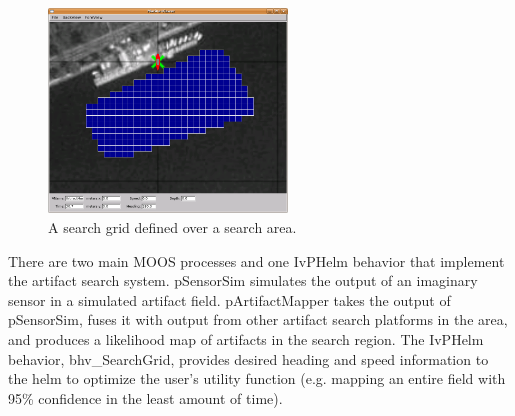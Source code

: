 \begin{figure}[ht]
\label{searchgrid}
\begin{minipage}[c]{0.5\textwidth}
  \centering \includegraphics[width=2.5in]{figures/searchgrid}
\end{minipage}%
\caption{A search grid defined over a search area.} 
\end{figure}

There are two main MOOS processes and one IvPHelm behavior that implement the artifact search system.  pSensorSim simulates the output of an imaginary sensor in a simulated artifact field.  pArtifactMapper takes the output of pSensorSim, fuses it with output from other artifact search platforms in the area, and produces a likelihood map of artifacts in the search region.  The IvPHelm behavior, bhv\_SearchGrid, provides desired heading and speed information to the helm to optimize the user's utility function (e.g. mapping an entire field with 95\% confidence in the least amount of time).
